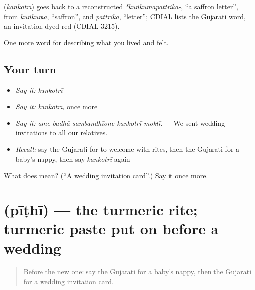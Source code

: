 \begin{cousinweb}
\textbf{} (\emph{kankotrī}) goes back to a reconstructed \emph{*kuṅkumapattrikā-}, \textquotedblleft{}a saffron letter\textquotedblright{}, from \emph{kuṅkuma}, \textquotedblleft{}saffron\textquotedblright{}, and \emph{pattrikā}, \textquotedblleft{}letter\textquotedblright{}; CDIAL lists the Gujarati word, an invitation dyed red (CDIAL 3215).
\end{cousinweb}

\begin{grammarlens}[title={What you've built}]
One more word for describing what you lived and felt.
\end{grammarlens}

\subsection*{Your turn}
\begin{itemize}
\raggedright
  \item \emph{Say it:} \emph{kankotrī}
  \item \emph{Say it:} \emph{kankotrī}, once more
  \item \emph{Say it:} \emph{ame badhā sambandhīone kankotrī moklī.} — We sent wedding invitations to all our relatives.
  \item \emph{Recall:} say the Gujarati for to welcome with rites, then the Gujarati for a baby's nappy, then say \emph{kankotrī} again
\end{itemize}

\begin{tcolorbox}[breakable,colback=teal!4,colframe=teal!35!black,title={Before you move on}]
What does  mean? (\textquotedblleft{}A wedding invitation card\textquotedblright{}.) Say it once more.
\end{tcolorbox}
\section[\texorpdfstring{\gu{પીઠી} (pīṭhī)}{પીઠી (pīṭhī)}]{ (pīṭhī) — the turmeric rite; turmeric paste put on before a wedding}

\label{lesson:GU-C497-pithi}



\begin{quote}
Before the new one: say the Gujarati for a baby's nappy, then the Gujarati for a wedding invitation card.
\end{quote}

